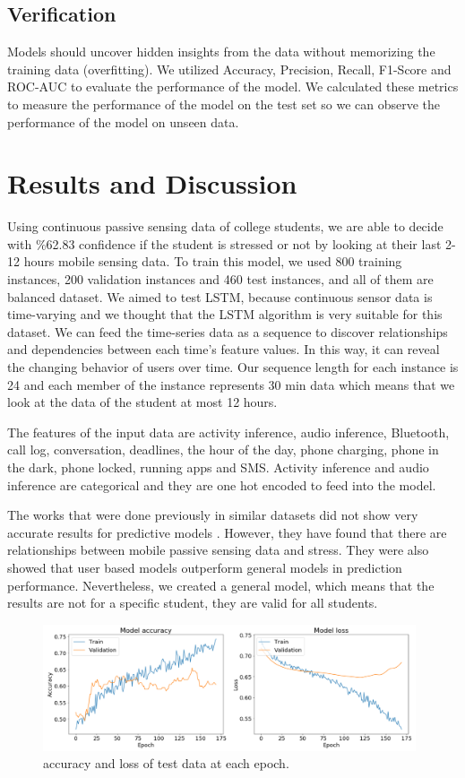 \documentclass[3p,times,procedia]{elsarticle}
\begin{document}
\subsection{Verification}
Models should uncover hidden insights from the data without memorizing the training data (overfitting). We utilized Accuracy, Precision, Recall, F1-Score and ROC-AUC to evaluate the performance of the model. We calculated these metrics to measure the performance of the model on the test set so we can observe the performance of the model on unseen data. 

\section{Results and Discussion}
Using continuous passive sensing data of college students, we are able to decide with \%62.83 confidence if the student is stressed or not by looking at their last 2-12 hours mobile sensing data. To train this model, we used 800 training instances, 200 validation instances and 460 test instances, and all of them are balanced dataset. We aimed to test LSTM, because continuous sensor data is time-varying and we thought that the LSTM algorithm is very suitable for this dataset. We can feed the time-series data as a sequence to discover relationships and dependencies between each time's feature values. In this way, it can reveal the changing behavior of users over time. Our sequence length for each instance is 24 and each member of the instance represents 30 min data which means that we look at the data of the student at most 12 hours. 

The features of the input data are activity inference, audio inference, Bluetooth, call log, conversation, deadlines, the hour of the day, phone charging, phone in the dark, phone locked, running apps and SMS. Activity inference and audio inference are categorical and they are one hot encoded to feed into the model.

The works that were done previously in similar datasets did not show very accurate results for predictive models \cite{Wang2014, DaSilva2019, Becker2016, Pratap2019}. However, they have found that there are relationships between mobile passive sensing data and stress. They were also showed that user based models outperform general models in prediction performance. Nevertheless, we created a general model, which means that the results are not for a specific student, they are valid for all students.

\begin{figure}[t]\vspace*{4pt}
\centerline{\includegraphics[width=110mm]{graphics/loss_acc.jpg}}
\caption{accuracy and loss of test data at each epoch.}
\end{figure}
\end{document}

